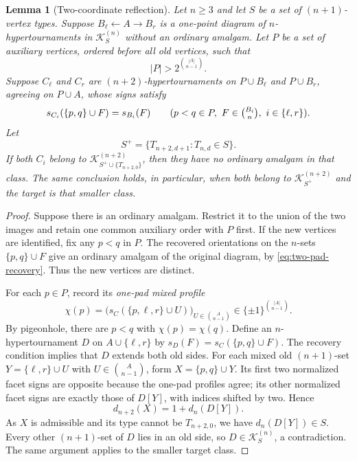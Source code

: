 \documentclass[11pt,a4paper]{article}
\newtheorem{lemma}[theorem]{Lemma}
\theoremstyle{remark}
\newcommand{\K}{\mathcal K}
\begin{document}
\begin{lemma}[Two-coordinate reflection]\label{lem:reflection}
Let $n\ge3$ and let $S$ be a set of $(n+1)$-vertex types.
Suppose $B_\ell\leftarrow A\rightarrow B_r$ is a one-point
diagram of $n$-hypertournaments in $\K^{(n)}_S$ without an ordinary
amalgam. Let $P$ be a set of auxiliary vertices, ordered before all
old vertices, such that
\[
 |P|>2^{\binom{|A|}{n-1}}.
\]
Suppose $C_\ell$ and $C_r$ are $(n+2)$-hypertournaments on
$P\cup B_\ell$ and $P\cup B_r$, agreeing on $P\cup A$,
whose signs satisfy
\begin{equation}\label{eq:two-pad-recovery}
 s_{C_i}(\{p,q\}\cup F)=s_{B_i}(F)
 \qquad(p<q\in P,\ F\in\tbinom{B_i}n,\ i\in\{\ell,r\}).
\end{equation}
Let
\[
 S^+=\{T_{n+2,d+1}:T_{n,d}\in S\}.
\]
If both $C_i$ belong to
$\K^{(n+2)}_{S^+\cup\{T_{n+2,0}\}}$, then they have no ordinary
amalgam in that class. The same conclusion holds, in particular,
when both belong to $\K^{(n+2)}_{S^+}$ and the target is that smaller class.
\end{lemma}
\begin{proof}
Suppose there is an ordinary amalgam. Restrict it to the union of
the two images and retain one common auxiliary order with $P$
first. If the new vertices are identified, fix any $p<q$ in $P$.
The recovered orientations on the $n$-sets $\{p,q\}\cup F$ give
an ordinary amalgam of the original diagram, by
\eqref{eq:two-pad-recovery}. Thus the new vertices are distinct.

For each $p\in P$, record its \emph{one-pad mixed profile}
\[
 \chi(p)=\bigl(s_C(\{p,\ell,r\}\cup U)\bigr)_
 {U\in\binom A{n-1}}\in\{\pm1\}^{\binom{|A|}{n-1}}.
\]
By pigeonhole, there are $p<q$ with $\chi(p)=\chi(q)$.
Define an $n$-hypertournament $D$ on $A\cup\{\ell,r\}$ by
$s_D(F)=s_C(\{p,q\}\cup F)$. The recovery condition implies
that $D$ extends both old sides. For each mixed old
$(n+1)$-set $Y=\{\ell,r\}\cup U$ with
$U\in\binom A{n-1}$, form $X=\{p,q\}\cup Y$.
Its first two normalized facet signs are opposite because the
one-pad profiles agree; its other normalized facet signs are
exactly those of $D[Y]$, with indices shifted by two. Hence
\[
 d_{n+2}(X)=1+d_n(D[Y]).
\]
As $X$ is admissible and its type cannot be $T_{n+2,0}$,
we have $d_n(D[Y])\in S$. Every other $(n+1)$-set of $D$
lies in an old side, so $D\in\K^{(n)}_S$, a contradiction.
The same argument applies to the smaller target class.
\end{proof}
\end{document}
